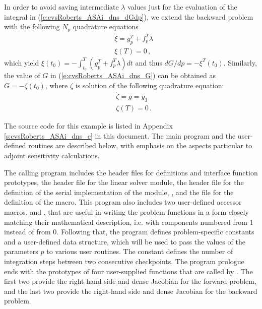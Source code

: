 In order to avoid saving intermediate $\lambda$ values just for the
evaluation of the integral in (\ref{e:cvsRoberts_ASAi_dns_dGdp}), we extend the
backward problem with the following $N_p$ quadrature equations
\begin{equation}\label{e:cvsRoberts_ASAi_dns_XI}
  \begin{split}
    &{\dot\xi} = g_p^T + f_p^T \lambda \\
    &\xi (T) = 0 \, ,
  \end{split}
\end{equation}
which yield $\xi(t_0) = - \int_{t_0}^{T} ( g_p^T + f_p^T \lambda) dt$
and thus ${dG}/{dp} = -\xi^T(t_0)$.
Similarly, the value of $G$ in (\ref{e:cvsRoberts_ASAi_dns_G}) can be obtained as
$G = - \zeta(t_0)$, where $\zeta$ is solution of the following quadrature
equation:
\begin{equation}\label{e:cvsRoberts_ASAi_dns_ZETA}
  \begin{split}
    &{\dot\zeta} = g = y_3 \\
    &\zeta(T) = 0 \, .
  \end{split}
\end{equation}

The source code for this example is listed in Appendix \ref{s:cvsRoberts_ASAi_dns_c}
in this document.
The main program and the user-defined routines are described below, 
with emphasis on the aspects particular to adjoint sensitivity calculations.

The calling program includes the {\cvodes} header files  
for {\cvodes} definitions and interface function prototypes,
the header file  for the {\cvdense} linear solver module,
the header file  for the definition of the serial implementation
of the {\nvector} module, {\nvecs}, and the file  for the
definition of the  macro.
This program also includes two user-defined accessor macros,  and ,
that are useful in writing the problem functions in a form closely matching their
mathematical description, i.e. with components numbered from 1 instead of from 0. 
Following that, the program defines problem-specific constants and a user-defined 
data structure, which will be used to pass the values of the parameters $p$ to various
user routines. The constant  defines the number of integration steps
between two consecutive checkpoints.
The program prologue ends with the prototypes of four user-supplied functions that are
called by {\cvodes}. The first two provide the right-hand side and dense Jacobian
for the forward problem, and the last two provide the right-hand side and dense
Jacobian for the backward problem.

